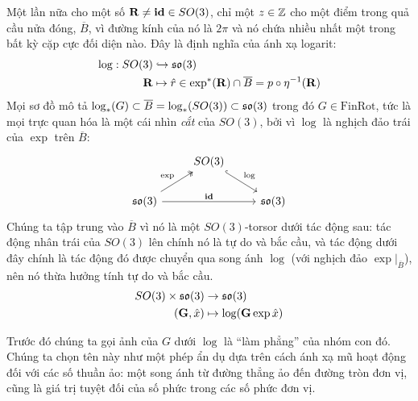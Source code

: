 \documentclass{article}
\theoremstyle{plain}
\theoremstyle{definition}
\begin{document}
    Một lần nữa cho một số $\mathbf{R}\neq\mathbf{id} \in SO(3)$, chỉ một $z\in \mathbb{Z}$ cho một điểm trong quả cầu nửa đóng, $\overline{B}$, vì đường kính của nó là $2\pi$ và nó chứa nhiều nhất một trong bất kỳ cặp cực đối diện nào. Đây là định nghĩa của ánh xạ logarit:
    \begin{align}
        \log: SO(3)&\hookrightarrow \mathfrak{so}(3) \\
        \mathbf{R}&\mapsto \hat{r}\in\exp^*(\mathbf{R})\cap \overline{B} = p\circ \eta^{-1}(\mathbf{R})
    \end{align}
    Mọi sơ đồ mô tả $\log_*(G)\subset\overline{B}=\log_*(SO(3))\subset\mathfrak{so}(3)$ trong đó $G\in \mathrm{FinRot}$, tức là mọi trực quan hóa là một cái nhìn \emph{cắt} của $SO(3)$, bởi vì $\log$ là nghịch đảo trái của $\exp$ trên $\overline{B}$: 
    \begin{equation}
        \begin{tikzcd}
           & SO(3)\arrow[dr, hook, "\log"] & \\
           \so(3) \arrow[ur, two heads, "\exp"]\arrow[rr, "\id"]&& \so(3)
        \end{tikzcd}
    \end{equation}
    Chúng ta tập trung vào $\overline{B}$ vì nó là một $SO(3)$-torsor dưới tác động sau: tác động nhân trái của $SO(3)$ lên chính nó là tự do và bắc cầu, và tác động dưới đây chính là tác động đó được chuyển qua song ánh $\log$ (với nghịch đảo $\exp|_{\overline{B}}$), nên nó thừa hưởng tính tự do và bắc cầu.
    \begin{align}
        SO(3)\times \mathfrak{so}(3)&\to \mathfrak{so}(3)\\
        (\mathbf{G},\hat{x})&\mapsto \log(\mathbf{G}\exp{\hat{x}})\nonumber
    \end{align}
    
    Trước đó chúng ta gọi ảnh của $G$ dưới $\log$ là ``làm phẳng'' của nhóm con đó. Chúng ta chọn tên này như một phép ẩn dụ dựa trên cách ánh xạ mũ hoạt động đối với các số thuần ảo:  một song ánh từ đường thẳng ảo đến đường tròn đơn vị, cũng là giá trị tuyệt đối của số phức trong các số phức đơn vị.
    
\end{document}
